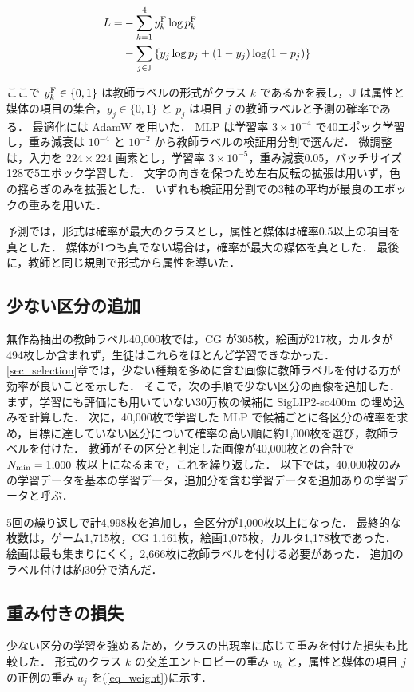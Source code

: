 \begin{align}
    L = &- \sum_{k=1}^{4} y^{\rm F}_k \log p^{\rm F}_k
    \nonumber \\
    &- \sum_{j \in {\mathbb J}} \left\{ y_j \log p_j + (1 - y_j) \log (1 - p_j) \right\}
    \label{eq_loss}
\end{align}

\noindent
ここで $ y^{\rm F}_k \in \{0, 1\} $ は教師ラベルの形式がクラス $ k $ であるかを表し，$ {\mathbb J} $ は属性と媒体の項目の集合，$ y_j \in \{0, 1\} $ と $ p_j $ は項目 $ j $ の教師ラベルと予測の確率である．
最適化には AdamW\cite{ref_adamw} を用いた．
MLP は学習率 $ 3 \times 10^{-4} $ で40エポック学習し，重み減衰は $ 10^{-4} $ と $ 10^{-2} $ から教師ラベルの検証用分割で選んだ．
微調整は，入力を $ 224 \times 224 $ 画素とし，学習率 $ 3 \times 10^{-5} $，重み減衰0.05，バッチサイズ128で5エポック学習した．
文字の向きを保つため左右反転の拡張は用いず，色の揺らぎのみを拡張とした．
いずれも検証用分割での3軸の平均が最良のエポックの重みを用いた．

予測では，形式は確率が最大のクラスとし，属性と媒体は確率0.5以上の項目を真とした．
媒体が1つも真でない場合は，確率が最大の媒体を真とした．
最後に，教師と同じ規則で形式から属性を導いた．

\subsection{少ない区分の追加}
無作為抽出の教師ラベル40,000枚では，CG が305枚，絵画が217枚，カルタが494枚しか含まれず，生徒はこれらをほとんど学習できなかった．
\ref{sec_selection}章では，少ない種類を多めに含む画像に教師ラベルを付ける方が効率が良いことを示した．
そこで，次の手順で少ない区分の画像を追加した．
まず，学習にも評価にも用いていない30万枚の候補に SigLIP2-so400m の埋め込みを計算した．
次に，40,000枚で学習した MLP で候補ごとに各区分の確率を求め，目標に達していない区分について確率の高い順に約1,000枚を選び，教師ラベルを付けた．
教師がその区分と判定した画像が40,000枚との合計で $ N_{\rm min} = 1{,}000 $ 枚以上になるまで，これを繰り返した．
以下では，40,000枚のみの学習データを基本の学習データ，追加分を含む学習データを追加ありの学習データと呼ぶ．

5回の繰り返しで計4,998枚を追加し，全区分が1,000枚以上になった．
最終的な枚数は，ゲーム1,715枚，CG 1,161枚，絵画1,075枚，カルタ1,178枚であった．
絵画は最も集まりにくく，2,666枚に教師ラベルを付ける必要があった．
追加のラベル付けは約30分で済んだ．

\subsection{重み付きの損失}
少ない区分の学習を強めるため，クラスの出現率に応じて重みを付けた損失も比較した．
形式のクラス $ k $ の交差エントロピーの重み $ v_k $ と，属性と媒体の項目 $ j $ の正例の重み $ u_j $ を(\ref{eq_weight})に示す．

